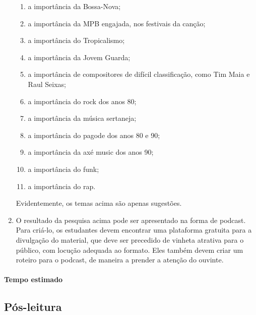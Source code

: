 \documentclass[12pt]{extarticle}
\begin{document}
\begin{enumerate}
\begin{enumerate}
\item a importância da Bossa-Nova;

\item a importância da MPB engajada, nos festivais da canção;

\item a importância do Tropicalismo;

\item a importância da Jovem Guarda;

\item a importância de compositores de difícil classificação, como Tim Maia
e Raul Seixas;

\item a importância do rock dos anos 80;

\item a importância da música sertaneja;

\item a importância do pagode dos anos 80 e 90;

\item a importância da axé music dos anos 90;

\item a importância do funk;

\item a importância do rap.
\end{enumerate}

Evidentemente, os temas acima são apenas sugestões.

\item O resultado da pesquisa acima pode ser apresentado na forma de
podcast. Para criá-lo, os estudantes devem encontrar uma plataforma
gratuita para a divulgação do material, que deve ser precedido de
vinheta atrativa para o público, com locução adequada ao formato. Eles
também devem criar um roteiro para o podcast, de maneira a prender a
atenção do ouvinte.
\end{enumerate}

\paragraph{Tempo estimado}

\subsection{Pós-leitura}

%
%
\end{document}
